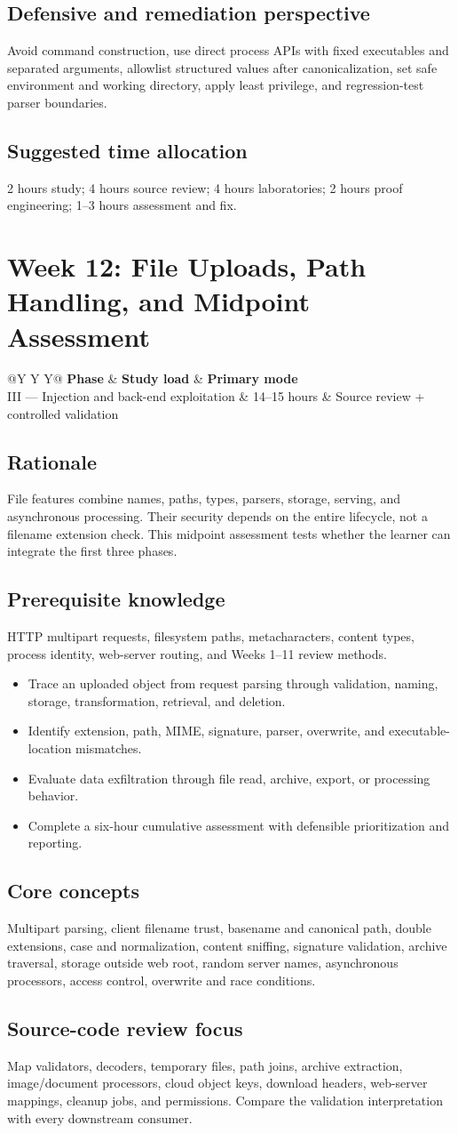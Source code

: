 \documentclass[11pt]{article}
\makeatletter
\newcommand{\weekheader}[4]{%
  \clearpage
  \section{Week #1: #2}
  \begin{tcolorbox}[colback=Navy,colframe=Navy,coltext=white]
    \begin{tabularx}{\linewidth}{@{}Y Y Y@{}}
      \textbf{Phase} & \textbf{Study load} & \textbf{Primary mode}\\
      #3 & #4 hours & Source review + controlled validation
    \end{tabularx}
  \end{tcolorbox}
}
\newcommand{\weekfield}[2]{%
  \Needspace{5\baselineskip}
  \subsection*{#1}
  #2
}
\makeatother
\begin{document}
\weekfield{Defensive and remediation perspective}{Avoid command construction,
use direct process APIs with fixed executables and separated arguments, allowlist
structured values after canonicalization, set safe environment and working
directory, apply least privilege, and regression-test parser boundaries.}

\weekfield{Suggested time allocation}{2 hours study; 4 hours source review; 4
hours laboratories; 2 hours proof engineering; 1--3 hours assessment and fix.}

\weekheader{12}{File Uploads, Path Handling, and Midpoint Assessment}{III --- Injection and back-end exploitation}{14--15}

\weekfield{Rationale}{File features combine names, paths, types, parsers,
storage, serving, and asynchronous processing. Their security depends on the
entire lifecycle, not a filename extension check. This midpoint assessment tests
whether the learner can integrate the first three phases.}

\weekfield{Prerequisite knowledge}{HTTP multipart requests, filesystem paths,
metacharacters, content types, process identity, web-server routing, and Weeks
1--11 review methods.}

\begin{objectivebox}
\begin{itemize}
  \item Trace an uploaded object from request parsing through validation, naming, storage, transformation, retrieval, and deletion.
  \item Identify extension, path, MIME, signature, parser, overwrite, and executable-location mismatches.
  \item Evaluate data exfiltration through file read, archive, export, or processing behavior.
  \item Complete a six-hour cumulative assessment with defensible prioritization and reporting.
\end{itemize}
\end{objectivebox}

\weekfield{Core concepts}{Multipart parsing, client filename trust, basename and
canonical path, double extensions, case and normalization, content sniffing,
signature validation, archive traversal, storage outside web root, random server
names, asynchronous processors, access control, overwrite and race conditions.}

\weekfield{Source-code review focus}{Map validators, decoders, temporary files,
path joins, archive extraction, image/document processors, cloud object keys,
download headers, web-server mappings, cleanup jobs, and permissions. Compare the
validation interpretation with every downstream consumer.}
\end{document}
